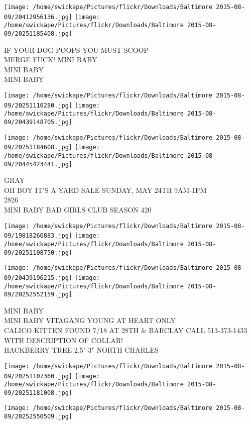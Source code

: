 \documentclass[10pt,letterpaper]{article}
\begin{document}
\texttt{[image: /home/swickape/Pictures/flickr/Downloads/Baltimore 2015-08-09/20412956136.jpg]}
\texttt{[image: /home/swickape/Pictures/flickr/Downloads/Baltimore 2015-08-09/20251185408.jpg]}

IF YOUR DOG POOPS YOU MUST SCOOP\\
MERGE FUCK! MINI BABY\\
MINI BABY\\
MINI BABY
\pagebreak

\texttt{[image: /home/swickape/Pictures/flickr/Downloads/Baltimore 2015-08-09/20251110280.jpg]}
\texttt{[image: /home/swickape/Pictures/flickr/Downloads/Baltimore 2015-08-09/20439148705.jpg]}

\texttt{[image: /home/swickape/Pictures/flickr/Downloads/Baltimore 2015-08-09/20251184608.jpg]}
\texttt{[image: /home/swickape/Pictures/flickr/Downloads/Baltimore 2015-08-09/20445423441.jpg]}

GRAY\\
OH BOY IT'S A YARD SALE SUNDAY, MAY 24TH 9AM{-}1PM\\
2826\\
MINI BABY BAD GIRLS CLUB SEASON 420
\pagebreak

\texttt{[image: /home/swickape/Pictures/flickr/Downloads/Baltimore 2015-08-09/19818266883.jpg]}
\texttt{[image: /home/swickape/Pictures/flickr/Downloads/Baltimore 2015-08-09/20251108750.jpg]}

\texttt{[image: /home/swickape/Pictures/flickr/Downloads/Baltimore 2015-08-09/20439196215.jpg]}
\texttt{[image: /home/swickape/Pictures/flickr/Downloads/Baltimore 2015-08-09/20252552159.jpg]}

MINI BABY\\
MINI BABY VITAGANG YOUNG AT HEART ONLY\\
CALICO KITTEN FOUND 7/18 AT 28TH \& BARCLAY CALL 513{-}373{-}1433 WITH DESCRIPTION OF COLLAR!\\
HACKBERRY TREE 2.5"{-}3" NORTH CHARLES
\pagebreak

\texttt{[image: /home/swickape/Pictures/flickr/Downloads/Baltimore 2015-08-09/20251107360.jpg]}
\texttt{[image: /home/swickape/Pictures/flickr/Downloads/Baltimore 2015-08-09/20251181008.jpg]}

\texttt{[image: /home/swickape/Pictures/flickr/Downloads/Baltimore 2015-08-09/20252550509.jpg]}
\end{document}
